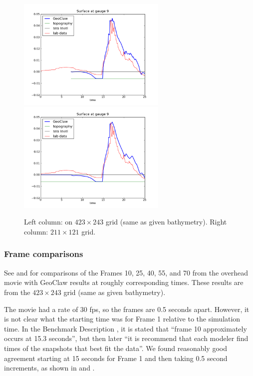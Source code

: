\begin{figure}[ht]
\vskip 5pt
\hfil\includegraphics[width=2.8in]{bp7/figs423/gauge0009fig300.png}\hfil
\hfil\includegraphics[width=2.8in]{bp7/figs211/gauge0009fig300.png}\hfil
\caption{\label{fig:bp7gauges} 
Left column: on $423\times 243$ grid (same as given bathymetry).
Right column: $211\times 121$ grid.
  }
\end{figure}



\subsubsection{Frame comparisons}

See  and  for comparisons of the Frames 10,
25, 40, 55, and 70 from the overhead movie with GeoClaw results at roughly
corresponding times.  These results are from the $423\times 243$ grid (same
as given bathymetry).

The movie had a rate of 30 fps, so the frames are 0.5 seconds apart. However,
it is not clear what the starting time was for Frame 1 relative to the
simulation time.   In the Benchmark Description \cite{bp7description}, it is
stated that ``frame 10 approximately occurs at 15.3 seconds'', but then later
``it is recommend that each modeler find times of the snapshots that best fit
the data''.   We found reasonably good agreement starting at 15 seconds for
Frame 1 and then taking 0.5 second increments, as shown in 
and .

